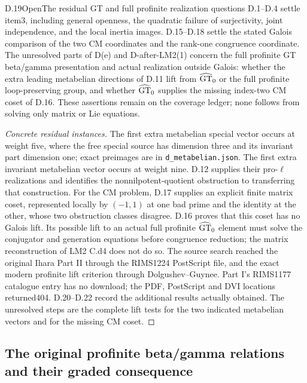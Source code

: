 \begin{statement}{D.19}{Open}{The residual GT and full profinite realization questions}
D.1--D.4 settle item3, including general openness, the quadratic failure of surjectivity, joint independence, and the local inertia images. D.15--D.18 settle the stated Galois comparison of the two CM coordinates and the rank-one congruence coordinate. The unresolved parts of D(e) and D-after-LM2(1) concern the full profinite GT beta/gamma presentation and actual realization outside Galois: whether the extra leading metabelian directions of D.11 lift from $\widehat{\rm GT}_0$ or the full profinite loop-preserving group, and whether $\widehat{\rm GT}_0$ supplies the missing index-two CM coset of D.16. These assertions remain on the coverage ledger; none follows from solving only matrix or Lie equations.
\end{statement}
\begin{proof}[Concrete residual instances]
The first extra metabelian special vector occurs at weight five, where the free special source has dimension three and its invariant part dimension one; exact preimages are in \texttt{d\_metabelian.json}. The first extra invariant metabelian vector occurs at weight nine. D.12 supplies their pro-$\ell$ realizations and identifies the nonnilpotent-quotient obstruction to transferring that construction. For the CM problem, D.17 supplies an explicit finite matrix coset, represented locally by $(-1,1)$ at one bad prime and the identity at the other, whose two obstruction classes disagree. D.16 proves that this coset has no Galois lift. Its possible lift to an actual full profinite $\widehat{\rm GT}_0$ element must solve the conjugator and generation equations before congruence reduction; the matrix reconstruction of LM2 C.d4 does not do so. The source search reached the original Ihara Part II through the RIMS1224 PostScript file, and the exact modern profinite lift criterion through Dolgushev--Guynee. Part I's RIMS1177 catalogue entry has no download; the PDF, PostScript and DVI locations returned404. D.20--D.22 record the additional results actually obtained. The unresolved steps are the complete lift tests for the two indicated metabelian vectors and for the missing CM coset.
\end{proof}

\subsection{The original profinite beta/gamma relations and their graded consequence}

